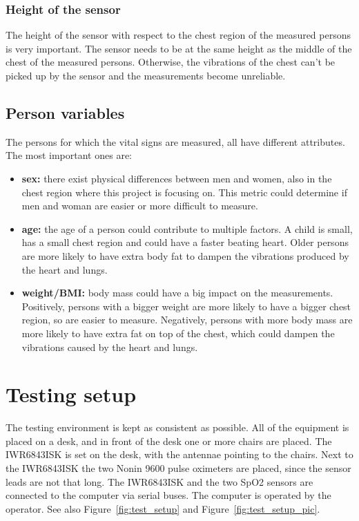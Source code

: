 \subsubsection{Height of the sensor}
The height of the sensor with respect to the chest region of the measured persons is very important. The sensor needs to be at the same height as the middle of the chest of the measured persons. Otherwise, the vibrations of the chest can't be picked up by the sensor and the measurements become unreliable.

\subsection{Person variables}
\label{sec:person_metrics}
The persons for which the vital signs are measured, all have different attributes. The most important ones are:

\begin{itemize}
    \item \textbf{sex:} there exist physical differences between men and women, also in the chest region where this project is focusing on. This metric could determine if men and woman are easier or more difficult to measure.
    \item \textbf{age:} the age of a person could contribute to multiple factors. A child is small, has a small chest region and could have a faster beating heart. Older persons are more likely to have extra body fat to dampen the vibrations produced by the heart and lungs.
    \item \textbf{weight/BMI:} body mass could have a big impact on the measurements. Positively, persons with a bigger weight are more likely to have a bigger chest region, so are easier to measure. Negatively, persons with more body mass are more likely to have extra fat on top of the chest, which could dampen the vibrations caused by the heart and lungs.
\end{itemize}

\section{Testing setup}
\label{sec:test_setup}
The testing environment is kept as consistent as possible. All of the equipment is placed on a desk, and in front of the desk one or more chairs are placed. The IWR6843ISK is set on the desk, with the antennae pointing to the chairs. Next to the IWR6843ISK the two Nonin 9600 pulse oximeters are placed, since the sensor leads are not that long. The IWR6843ISK and the two SpO2 sensors are connected to the computer via serial buses. The computer is operated by the operator. See also Figure~\ref{fig:test_setup} and Figure~\ref{fig:test_setup_pic}.

